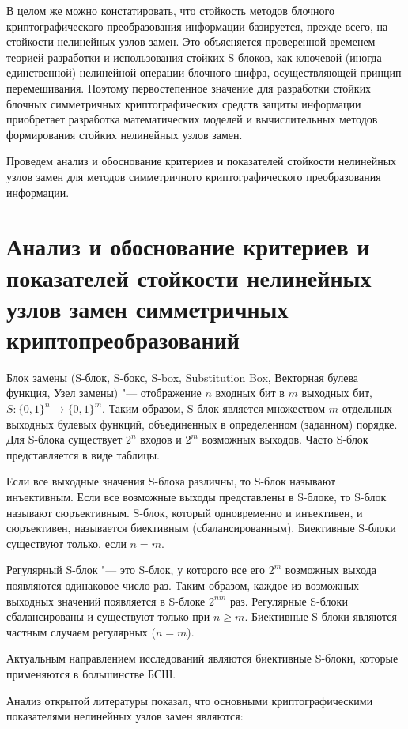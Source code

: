В целом же можно констатировать, что стойкость методов блочного
криптографического преобразования информации базируется, прежде всего, на
стойкости нелинейных узлов замен. Это объясняется проверенной временем теорией
разработки и использования стойких S-блоков, как ключевой (иногда единственной)
нелинейной операции блочного шифра, осуществляющей принцип перемешивания.
Поэтому первостепенное значение для разработки стойких блочных симметричных
криптографических средств защиты информации приобретает разработка
математических моделей и вычислительных методов формирования стойких нелинейных
узлов замен.

Проведем анализ  и обоснование критериев и показателей стойкости нелинейных
узлов замен для методов симметричного криптографического преобразования
информации.

\section{Анализ и обоснование критериев и показателей стойкости нелинейных узлов
замен симметричных криптопреобразований}

Блок замены (S-блок,  S-бокс,  S-box,  Substitution Box, Векторная булева
функция, Узел замены) "--- отображение $n$ входных бит в $m$ выходных бит, $S:
\{0, 1\}^n \rightarrow \{0, 1\}^m$. Таким образом, S-блок является множеством
$m$ отдельных выходных булевых функций, объединенных в определенном (заданном)
порядке. Для S-блока существует $2^n$ входов и $2^m$ возможных выходов. Часто
S-блок представляется в виде таблицы.

Если все выходные значения S-блока различны, то S-блок называют инъективным.
Если все возможные выходы представлены в S-блоке, то S-блок называют
сюръективным. S-блок, который одновременно и инъективен, и сюръективен,
называется  биективным (сбалансированным). Биективные S-блоки существуют только,
если $n = m$. 

Регулярный S-блок "--- это S-блок, у которого все его $2^m$ возможных выхода
появляются одинаковое число раз. Таким образом, каждое из возможных выходных
значений появляется в S-блоке $2^{nm}$ раз. Регулярные S-блоки сбалансированы и
существуют только при $n \geq m$. Биективные  S-блоки являются частным случаем
регулярных ($n = m$).

Актуальным направлением исследований являются биективные S-блоки, которые
применяются в большинстве БСШ.

Анализ открытой литературы показал, что основными криптографическими
показателями нелинейных узлов замен являются:

